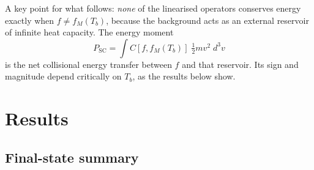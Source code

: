 \documentclass[11pt,a4paper]{article}
\begin{document}
A key point for what follows: \emph{none} of the linearised operators conserves
energy exactly when $f \neq f_M(T_b)$, because the background acts as an
external reservoir of infinite heat capacity. The energy moment
\begin{equation}
  P_\text{SC} = \int C[f, f_M(T_b)]\;\tfrac{1}{2}mv^2\;d^3v
  \label{eq:psc}
\end{equation}
is the net collisional energy transfer between $f$ and that reservoir. Its
sign and magnitude depend critically on $T_b$, as the results below show.

\section{Results}

\subsection{Final-state summary}
\end{document}
